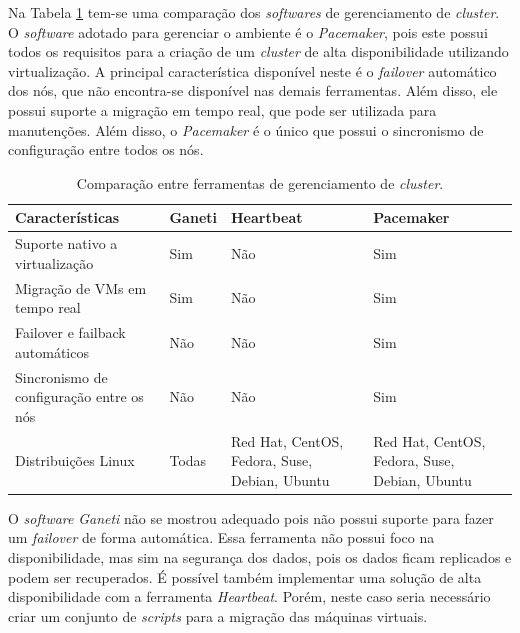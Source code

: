 Na Tabela \ref{tab:clusterger} tem-se uma comparação dos \textit{softwares} de gerenciamento de \textit{cluster}. 
O \textit{software} adotado para gerenciar o ambiente é o \textit{Pacemaker}, pois este possui todos os requisitos para a criação de um 
\textit{cluster} de alta disponibilidade utilizando virtualização. A principal característica disponível neste é o \textit{failover} automático
dos nós, que não encontra-se disponível nas demais ferramentas. Além disso, ele possui suporte a migração em tempo real, 
que pode ser utilizada para manutenções. Além disso, o \textit{Pacemaker} é o único que possui o sincronismo de configuração entre todos 
os nós. 

\begin{table}[h!]
\caption{Comparação entre ferramentas de gerenciamento de \textit{cluster}.}
\label{tab:clusterger}
\begin{center}
\begin{tabular}{|p{4cm}|p{2cm}|p{3.5cm}|p{3.5cm}|}\hline
\textbf{Características} & \textbf{Ganeti} & \textbf{Heartbeat} & \textbf{Pacemaker} \\\hline
Suporte nativo a virtualização & Sim & Não & Sim \\\hline
Migração de \acp{VM} em tempo real & Sim & Não & Sim \\\hline
Failover e failback automáticos & Não & Não & Sim \\\hline
Sincronismo de configuração entre os nós & Não & Não & Sim \\\hline
Distribuições Linux & Todas & Red Hat, CentOS, Fedora, Suse, Debian, Ubuntu & Red Hat, CentOS, Fedora, Suse, Debian, Ubuntu \\\hline
\end{tabular}
\end{center}
\end{table}

O \textit{software} \textit{Ganeti} não se mostrou adequado pois não possui suporte para fazer um \textit{failover} de forma automática. 
Essa ferramenta não possui foco na disponibilidade, mas sim na segurança dos dados, pois os dados ficam replicados e podem ser recuperados.
É possível também implementar uma solução de alta disponibilidade com a ferramenta \textit{Heartbeat}. Porém, neste caso seria necessário criar 
um conjunto de \textit{scripts} para a migração das máquinas virtuais.

